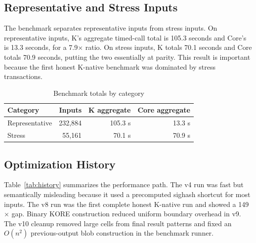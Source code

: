 \documentclass[conference]{IEEEtran}
\begin{document}
\subsection{Representative and Stress Inputs}

The benchmark separates representative inputs from stress inputs.  On
representative inputs, K's aggregate timed-call total is 105.3 seconds and
Core's is 13.3 seconds, for a 7.9$\times$ ratio.  On stress inputs, K totals
70.1 seconds and Core totals 70.9 seconds, putting the two essentially at
parity.  This result is
important because the first honest K-native benchmark was dominated by stress
transactions.

\begin{table}[htbp]
  \caption{Benchmark totals by category}
  \label{tab:category}
  \centering
  \footnotesize
  \begin{tabular}{lrrr}
    \toprule
    Category & Inputs & K aggregate & Core aggregate \\
    \midrule
    Representative & 232,884 & 105.3 s & 13.3 s \\
    Stress & 55,161 & 70.1 s & 70.9 s \\
    \bottomrule
  \end{tabular}
\end{table}

\subsection{Optimization History}

Table~\ref{tab:history} summarizes the performance path.  The v4 run was fast
but semantically misleading because it used a precomputed sighash shortcut for
most inputs.  The v8 run was the first complete honest K-native run and showed
a 149$\times$ gap.  Binary KORE construction reduced uniform boundary overhead
in v9.  The v10 cleanup removed large cells from final result patterns and
fixed an $O(n^2)$ previous-output blob construction in the benchmark runner.

\begin{table}[htbp]
  \caption{Benchmark history}
  \label{tab:history}
  \centering
  \footnotesize
\end{table}
\end{document}
